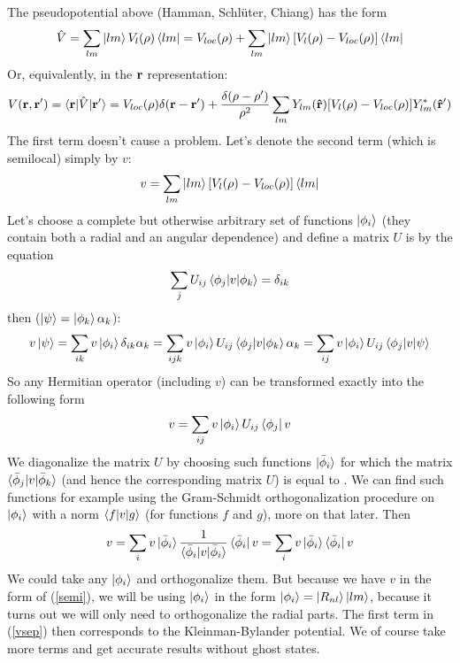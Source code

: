 The pseudopotential above (Hamman, Schlüter, Chiang) has the form 
\begin{equation*}
  \hat V=\sum_{lm} \mathinner{|{lm}\rangle}V_l(\rho)\mathinner{\langle{lm}|} =V_{loc}(\rho)+\sum_{lm} \mathinner{|{lm}\rangle}[V_l(\rho)-V_{loc}(\rho)]\mathinner{\langle{lm}|}
\end{equation*}
Or, equivalently, in the $\bf r$ representation: 
\begin{equation*}
  V({\bf r},{\bf r'})=\mathinner{\langle{{\bf r}|\hat V|{\bf r'}}\rangle}= V_{loc}(\rho)\delta({\bf r}-{\bf r'})+{\delta(\rho-\rho')\over\rho^2} \sum_{lm}Y_{lm}({\bf\hat r})[V_l(\rho)-V_{loc}(\rho)]Y_{lm}^*({\bf\hat r'})
\end{equation*}
The first term doesn't cause a problem. Let's denote the second term (which is semilocal) simply by $v$: 
\begin{equation*}
  v=\sum_{lm} \mathinner{|{lm}\rangle}[V_l(\rho)-V_{loc}(\rho)]\mathinner{\langle{lm}|}
\end{equation*}
Let's choose a complete but otherwise arbitrary set of functions $\mathinner{|{\phi_i}\rangle}$ (they contain both a radial and an angular dependence) and define a matrix $U$ is by the equation 
\begin{equation*}
  \sum_j U_{ij}\mathinner{\langle{\phi_j|v|\phi_k}\rangle}=\delta_{ik}
\end{equation*}
then ($\mathinner{|{\psi}\rangle}=\mathinner{|{\phi_k}\rangle}\alpha_k$): 
\begin{equation*}
  v\mathinner{|{\psi}\rangle} =\sum_{ik}v\mathinner{|{\phi_i}\rangle}\delta_{ik}\alpha_k =\sum_{ijk}v\mathinner{|{\phi_i}\rangle}U_{ij}\mathinner{\langle{\phi_j|v|\phi_k}\rangle}\alpha_k =\sum_{ij}v\mathinner{|{\phi_i}\rangle}U_{ij}\mathinner{\langle{\phi_j|v|\psi}\rangle}
\end{equation*}
So any Hermitian operator (including $v$) can be transformed exactly into the following form 
\begin{equation*}
  v=\sum_{ij}v\mathinner{|{\phi_i}\rangle}U_{ij}\mathinner{\langle{\phi_j}|}v
\end{equation*}
We diagonalize the matrix $U$ by choosing such functions $\mathinner{|{\bar\phi_i}\rangle}$ for which the matrix $\mathinner{\langle{\bar\phi_j|v|\bar\phi_k}\rangle}$ (and hence the corresponding matrix $U$) is equal to \one. We can find such functions for example using the Gram-Schmidt orthogonalization procedure on $\mathinner{|{\phi_i}\rangle}$ with a norm $\mathinner{\langle{f|v|g}\rangle}$ (for functions $f$ and $g$), more on that later. Then 
\begin{equation}
  v =\sum_{i}v\mathinner{|{\bar\phi_i}\rangle}{1\over\mathinner{\langle{\bar\phi_i|v|\bar\phi_i}\rangle}} \mathinner{\langle{\bar\phi_i}|}v =\sum_{i}v\mathinner{|{\bar\phi_i}\rangle}\mathinner{\langle{\bar\phi_i}|}v  \label{vsep}
\end{equation}
We could take any $\mathinner{|{\phi_i}\rangle}$ and orthogonalize them. But because we have
$v$ in the form of (\ref{semi}), we will be using $\mathinner{|{\phi_i}\rangle}$ in the form
$\mathinner{|{\phi_i}\rangle}=\mathinner{|{R_{nl}}\rangle}\mathinner{|{lm}\rangle}$, because it turns out we will only need to
orthogonalize the radial parts. The first term in (\ref{vsep}) then corresponds
to the Kleinman-Bylander potential\cite{kleinman-bylander}. We of course take more terms and get
accurate results without ghost states.

